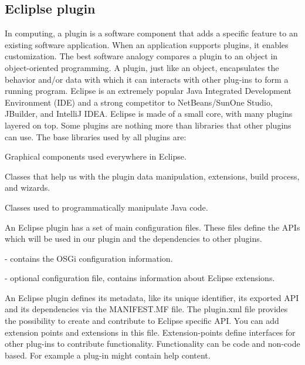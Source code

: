 \subsection{Ecliplse plugin}
	
	In computing, a plugin is a software component that adds a specific feature to an existing software application. 
When an application supports plugins, it enables customization. The best software analogy compares a plugin to an object in object-oriented
programming. A plugin, just like an object, encapsulates  the behavior and/or
data with which it can interacts with other plug-ins to form a running program.
	Eclipse is an extremely popular Java Integrated Development Environment (IDE)
and a strong competitor to NetBeans/SunOne Studio, JBuilder, and IntelliJ IDEA.
	Eclipse is made of a small core, with many plugins layered on top. Some plugins are nothing more than libraries that other plugins can use.
The base libraries used by all plugins are:

	\begin{description}[labelindent=2cm]
	\item[The Standard Widget Toolkit (SWT)]{Graphical components used everywhere
in Eclipse.}
	\item[The Plugin Developer Environment (PDE)]{ Classes that help us with the
plugin data manipulation, extensions, build process, and wizards.}
	\item[The Java Developer Toolkit (JDT)] {Classes used to programmatically
manipulate Java code.}
	\end{description}
	
	An Eclipse plugin has a set of main configuration files. These files 
define the APIs which will be used in our plugin and the dependencies to other
plugins.
	\begin{description}[labelindent=2cm]
		\item[MANIFEST.MF] - contains the OSGi configuration information.
		\item[plugin.xml] - optional configuration file, contains information about
Eclipse extensions.
	\end{description}
	An Eclipse plugin defines its metadata, like its unique identifier, its
exported API and its dependencies via the MANIFEST.MF file.
The plugin.xml file provides the possibility to create and contribute to Eclipse specific API. 
You can add extension points and extensions in this file.
Extension-points define interfaces for other plug-ins to contribute functionality. 
Functionality can be code and non-code based. For example a plug-in might
contain help content.
	


